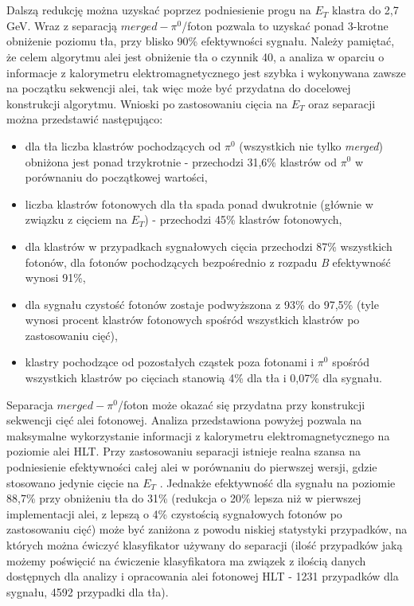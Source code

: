 \documentclass{pracamgr}
\begin{document}
\\\\
\noindent
Dalszą redukcję można uzyskać poprzez podniesienie progu na $E_T$ klastra do 2,7 GeV. Wraz z separacją $merged-\pi^0$/foton pozwala to uzyskać ponad 3-krotne obniżenie poziomu tła, przy blisko 90\% efektywności sygnału. Należy pamiętać, że celem algorytmu alei jest obniżenie tła o czynnik 40, a analiza w oparciu o informacje z kalorymetru elektromagnetycznego jest szybka i wykonywana zawsze na początku sekwencji alei, tak więc może być przydatna do docelowej konstrukcji algorytmu. Wnioski po zastosowaniu cięcia na $E_T$ oraz separacji można przedstawić następująco:
\begin{itemize}
 \item dla tła liczba klastrów pochodzących od $\pi^0$ (wszystkich nie tylko \textit{merged}) obniżona jest ponad trzykrotnie - przechodzi 31,6\% klastrów od $\pi^0$ w porównaniu do początkowej wartości,
 \item liczba klastrów fotonowych dla tła spada ponad dwukrotnie (głównie w związku z cięciem na $E_T$) - przechodzi 45\% klastrów fotonowych,
 \item dla klastrów w przypadkach sygnałowych cięcia przechodzi 87\% wszystkich fotonów, dla fotonów pochodzących bezpośrednio z rozpadu \textit{B} efektywność wynosi 91\%,
 \item dla sygnału czystość fotonów zostaje podwyższona z 93\% do 97,5\% (tyle wynosi procent klastrów fotonowych spośród wszystkich klastrów po zastosowaniu cięć),
 \item klastry pochodzące od pozostałych cząstek poza fotonami i $\pi^0$ spośród wszystkich klastrów po cięciach stanowią  4\% dla tła i 0,07\% dla sygnału.
\end{itemize}
\noindent
Separacja $merged-\pi^0$/foton może okazać się przydatna przy konstrukcji sekwencji cięć alei fotonowej. Analiza przedstawiona powyżej pozwala na maksymalne wykorzystanie informacji z kalorymetru elektromagnetycznego na poziomie alei HLT. Przy zastosowaniu separacji istnieje realna szansa na podniesienie efektywności całej alei w porównaniu do pierwszej wersji, gdzie stosowano jedynie cięcie na $E_T$ . Jednakże efektywność dla sygnału na poziomie 88,7\% przy obniżeniu tła do 31\%  (redukcja o 20\% lepsza niż w pierwszej implementacji alei, z lepszą o 4\% czystością sygnałowych fotonów po zastosowaniu cięć) może być zaniżona z powodu niskiej statystyki przypadków, na których można ćwiczyć klasyfikator używany do separacji (ilość przypadków jaką możemy poświęcić na ćwiczenie klasyfikatora ma związek z ilością danych dostępnych dla analizy i opracowania alei fotonowej HLT - 1231 przypadków dla sygnału, 4592 przypadki dla tła).
\end{document}
